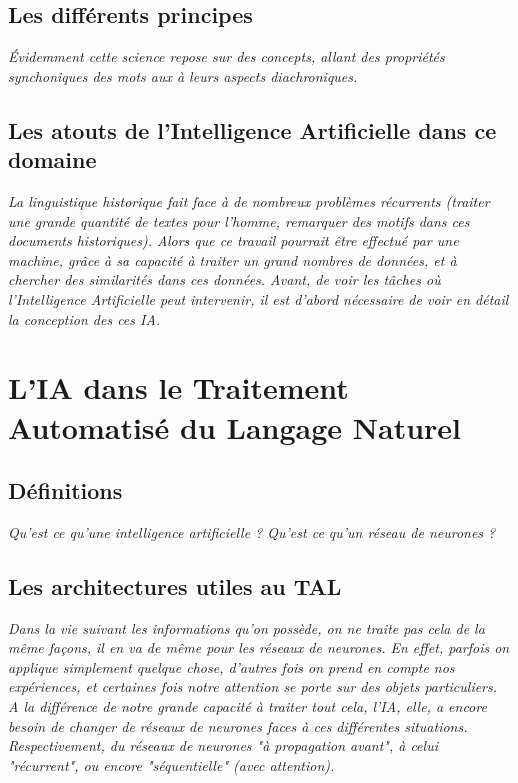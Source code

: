 \documentclass[12pt, letterpaper]{report}
\begin{document}
\subsection{Les différents principes}
\textit{Évidemment cette science repose sur des concepts, allant des propriétés synchoniques des mots aux à leurs aspects diachroniques.}
\subsection{Les atouts de l'Intelligence Artificielle dans ce domaine}
\textit{La linguistique historique fait face à de nombreux problèmes récurrents (traiter une grande quantité de textes pour l'homme, remarquer des motifs dans ces documents historiques). Alors que ce travail pourrait être effectué par une machine, grâce à sa capacité à traiter un grand nombres de données, et à chercher des similarités dans ces données. Avant, de voir les tâches où l'Intelligence Artificielle peut intervenir, il est d'abord nécessaire de voir en détail la conception des ces IA.}
\section{L'IA dans le Traitement Automatisé du Langage Naturel}
\subsection{Définitions}
\textit{Qu'est ce qu'une intelligence artificielle ? Qu'est ce qu'un réseau de neurones ?}
\subsection{Les architectures utiles au TAL}
\textit{Dans la vie suivant les informations qu'on possède, on ne traite pas cela de la même façons, il en va de même pour les réseaux de neurones. En effet, parfois on applique simplement quelque chose, d'autres fois on prend en compte nos expériences, et certaines fois notre attention se porte sur des objets particuliers. A la différence de notre grande capacité à traiter tout cela, l'IA, elle, a encore besoin de changer de réseaux de neurones faces à ces différentes situations. Respectivement, du réseaux de neurones "à propagation avant", à celui "récurrent", ou encore "séquentielle" (avec attention).}
\end{document}
